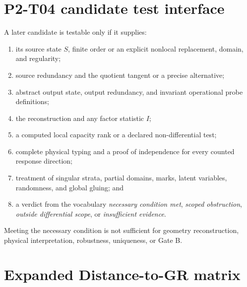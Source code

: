 \documentclass[11pt]{article}
\begin{document}
\section{P2-T04 candidate test interface}

A later candidate is testable only if it supplies:
\begin{enumerate}
  \item its source state \(S\), finite order or an explicit nonlocal
        replacement, domain, and regularity;
  \item source redundancy and the quotient tangent or a precise alternative;
  \item abstract output state, output redundancy, and invariant operational
        probe definitions;
  \item the reconstruction and any factor statistic \(I\);
  \item a computed local capacity rank or a declared non-differential test;
  \item complete physical typing and a proof of independence for every counted
        response direction;
  \item treatment of singular strata, partial domains, marks, latent
        variables, randomness, and global gluing; and
  \item a verdict from the vocabulary
        \emph{necessary condition met}, \emph{scoped obstruction},
        \emph{outside differential scope}, or \emph{insufficient evidence}.
\end{enumerate}
Meeting the necessary condition is not sufficient for geometry reconstruction,
physical interpretation, robustness, uniqueness, or Gate B.

\section{Expanded Distance-to-GR matrix}
\end{document}

